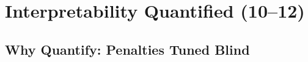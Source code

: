 \cleardoublepage
\chapter{Interpretability Quantified (10--12)}   %
\label{ch:iq}

\section{Why Quantify: Penalties Tuned Blind}
\label{sec:iq-motivation}
